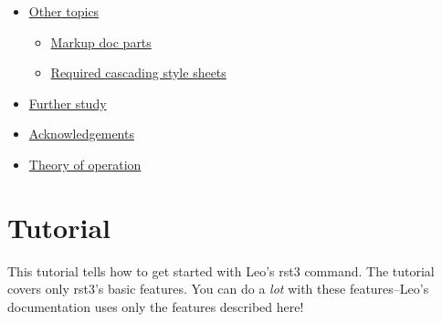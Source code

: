 \documentclass[a4paper,10pt,english]{sphinxmanual}
\begin{document}
{\begin{minipage}{0.95\linewidth}
\begin{itemize}
\begin{itemize}
\begin{itemize}
\item {} 
{\hyperref[rstplugin3:http-plugin-options]{Http plugin options}}

\item {} 
{\hyperref[rstplugin3:section-expansion-options]{Section expansion options}}

\end{itemize}

\item {} 
{\hyperref[rstplugin3:other-topics]{Other topics}}
\begin{itemize}
\item {} 
{\hyperref[rstplugin3:markup-doc-parts]{Markup doc parts}}

\item {} 
{\hyperref[rstplugin3:required-cascading-style-sheets]{Required cascading style sheets}}

\end{itemize}

\item {} 
{\hyperref[rstplugin3:further-study]{Further study}}

\item {} 
{\hyperref[rstplugin3:acknowledgements]{Acknowledgements}}

\item {} 
{\hyperref[rstplugin3:theory-of-operation]{Theory of operation}}

\end{itemize}

\end{itemize}
\end{minipage}}
\begin{center}\setlength{\fboxsep}{5pt}\end{center}


\section{Tutorial}
\label{rstplugin3:tutorial}\label{rstplugin3:wxlistmanager-leo}
This tutorial tells how to get started with Leo's rst3 command. The tutorial
covers only rst3's basic features. You can do a \emph{lot} with these features--Leo's
documentation uses only the features described here!
\end{document}
